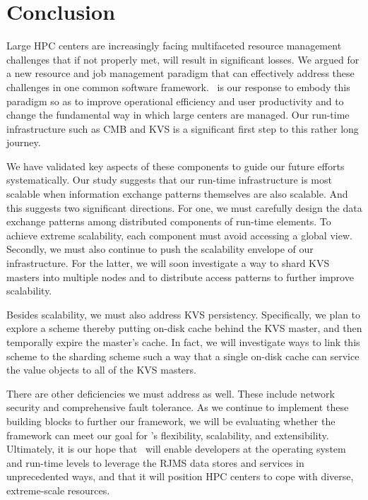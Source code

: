 \section{Conclusion}
Large HPC centers are increasingly facing 
multifaceted resource management challenges
that if not properly met, will result 
in significant losses.  
We argued for a new resource and job
management paradigm that can effectively
address these challenges in one common software framework.
\flux\ is our response to embody this paradigm 
so as to improve operational efficiency 
and user productivity and to change
the fundamental way in which large centers are managed.
Our run-time infrastructure such as CMB and KVS
is a significant first step to this rather long
journey.

We have validated key aspects of these
components to guide our future efforts systematically. 
Our study suggests that our run-time 
infrastructure is most scalable when information 
exchange patterns themselves are also scalable.
And this suggests two significant directions. 
For one, we must carefully design the data exchange patterns
among distributed components of run-time elements. 
To achieve extreme scalability, each component 
must avoid accessing a global view.
Secondly, we must also continue to push the 
scalability envelope of our infrastructure. 
For the latter, we will soon investigate a way to 
shard KVS masters into multiple nodes
and to distribute access patterns to further improve scalability.

Besides scalability, we must also address KVS persistency.
Specifically, we plan to explore a scheme
thereby putting on-disk cache behind the KVS master,
and then temporally expire the master's cache.
In fact, we will investigate ways to link
this scheme to the sharding scheme such a way
that a single on-disk cache can service the value
objects to all of the KVS masters.

There are other deficiencies we must address as well.
These include network security and
comprehensive fault tolerance. 
As we continue to implement these building blocks 
to further our framework, we will be evaluating 
whether the framework can meet our goal for \flux's 
flexibility, scalability, and extensibility. 
Ultimately, it is our hope that \flux\ will 
enable developers at the operating system and
run-time levels to leverage the RJMS data stores and services in
unprecedented ways, and that it will position HPC centers to cope
with diverse, extreme-scale resources.
